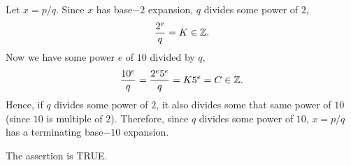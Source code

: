 \begin{questions}

\begin{solution}
Let $x=p/q$. Since $x$ has base$-2$ expansion, $q$ divides some power of $2$,
\begin{align*}
\frac{2^e}{q}=K\in \mathbb{Z}.
\end{align*}
Now we have some power $e$ of $10$ divided by $q$,
\begin{align*}
\frac{10^e}{q}=\frac{2^e5^e}{q}=K5^e=C\in \mathbb{Z}.
\end{align*}
Hence, if $q$ divides some power of $2$, it also divides some that same power of $10$ (since $10$ is multiple of $2$). Therefore, since $q$ divides some power of $10$, $x=p/q$ has a terminating base$-10$ expansion. 

The assertion is TRUE.
\end{solution}
\end{questions}
